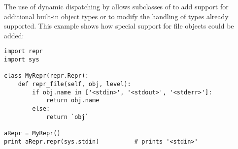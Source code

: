 The use of dynamic dispatching by  allows
subclasses of  to add support for additional built-in
object types or to modify the handling of types already supported.
This example shows how special support for file objects could be
added:

\begin{verbatim}
import repr
import sys

class MyRepr(repr.Repr):
    def repr_file(self, obj, level):
        if obj.name in ['<stdin>', '<stdout>', '<stderr>']:
            return obj.name
        else:
            return `obj`

aRepr = MyRepr()
print aRepr.repr(sys.stdin)          # prints '<stdin>'
\end{verbatim}

